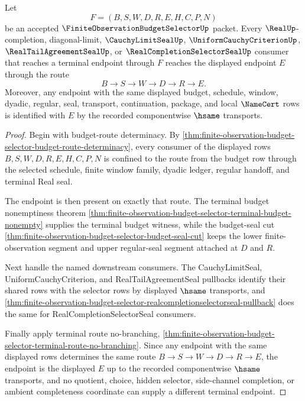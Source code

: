 \begin{theorem}
\label{thm:finite-observation-budget-selector-terminal-route-endpoint-exactness}
Let
$$
F=(B,S,W,D,R,E,H,C,P,N)
$$
be an accepted $\FiniteObservationBudgetSelectorUp$ packet. Every $\RealUp$-completion, diagonal-limit, $\CauchyLimitSealUp$, $\UniformCauchyCriterionUp$, $\RealTailAgreementSealUp$, or $\RealCompletionSelectorSealUp$ consumer that reaches a terminal endpoint through $F$ reaches the displayed endpoint $E$ through the route
$$
B \to S \to W \to D \to R \to E.
$$
Moreover, any endpoint with the same displayed budget, schedule, window, dyadic, regular, seal, transport, continuation, package, and local $\NameCert$ rows is identified with $E$ by the recorded componentwise $\hsame$ transports.
\end{theorem}
\begin{proof}
Begin with budget-route determinacy. By \autoref{thm:finite-observation-budget-selector-budget-route-determinacy}, every consumer of the displayed rows $B,S,W,D,R,E,H,C,P,N$ is confined to the route from the budget row through the selected schedule, finite window family, dyadic ledger, regular handoff, and terminal Real seal.

The endpoint is then present on exactly that route. The terminal budget nonemptiness theorem \autoref{thm:finite-observation-budget-selector-terminal-budget-nonempty} supplies the terminal budget witness, while the budget-seal cut \autoref{thm:finite-observation-budget-selector-budget-seal-cut} keeps the lower finite-observation segment and upper regular-seal segment attached at $D$ and $R$.

Next handle the named downstream consumers. The CauchyLimitSeal, UniformCauchyCriterion, and RealTailAgreementSeal pullbacks identify their shared rows with the selector rows by displayed $\hsame$ transports, and \autoref{thm:finite-observation-budget-selector-realcompletionselectorseal-pullback} does the same for RealCompletionSelectorSeal consumers.

Finally apply terminal route no-branching, \autoref{thm:finite-observation-budget-selector-terminal-route-no-branching}. Since any endpoint with the same displayed rows determines the same route $B \to S \to W \to D \to R \to E$, the endpoint is the displayed $E$ up to the recorded componentwise $\hsame$ transports, and no quotient, choice, hidden selector, side-channel completion, or ambient completeness coordinate can supply a different terminal endpoint.
\end{proof}

